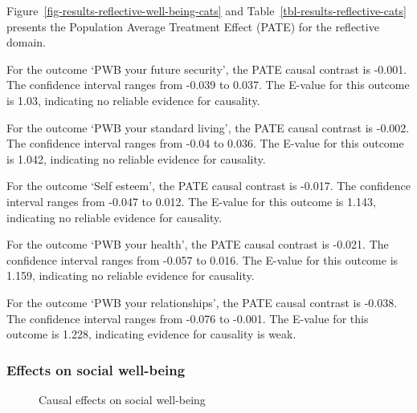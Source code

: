 \documentclass[
  singlecolumn,
  9pt]{article}
\begin{document}
Figure~\ref{fig-results-reflective-well-being-cats} and
Table~\ref{tbl-results-reflective-cats} presents the Population Average
Treatment Effect (PATE) for the reflective domain.

For the outcome `PWB your future security', the PATE causal contrast is
-0.001. The confidence interval ranges from -0.039 to 0.037. The E-value
for this outcome is 1.03, indicating no reliable evidence for causality.

For the outcome `PWB your standard living', the PATE causal contrast is
-0.002. The confidence interval ranges from -0.04 to 0.036. The E-value
for this outcome is 1.042, indicating no reliable evidence for
causality.

For the outcome `Self esteem', the PATE causal contrast is -0.017. The
confidence interval ranges from -0.047 to 0.012. The E-value for this
outcome is 1.143, indicating no reliable evidence for causality.

For the outcome `PWB your health', the PATE causal contrast is -0.021.
The confidence interval ranges from -0.057 to 0.016. The E-value for
this outcome is 1.159, indicating no reliable evidence for causality.

For the outcome `PWB your relationships', the PATE causal contrast is
-0.038. The confidence interval ranges from -0.076 to -0.001. The
E-value for this outcome is 1.228, indicating evidence for causality is
weak.

\newpage{}

\subsubsection{Effects on social
well-being}\label{effects-on-social-well-being}

\begin{figure}


\caption{\label{fig-results-social-wellbeing-cats}Causal effects on
social well-being}

\end{figure}%

\newpage{}
\end{document}
